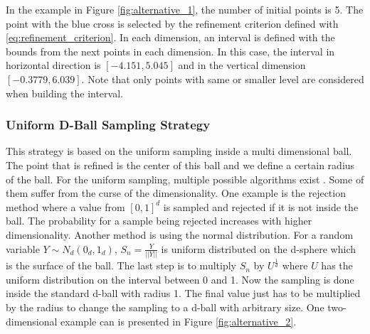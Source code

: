 In the example in Figure \ref{fig:alternative_1}, the number of initial points is 5. The point with the blue cross is selected by the refinement criterion defined with \ref{eq:refinement_criterion}. In each dimension, an interval is defined with the bounds from the next points in each dimension. In this case, the interval in horizontal direction is $ [-4.151, 5.045] $ and in the vertical dimension $ [-0.3779, 6.039] $. Note that only points with same or smaller level are considered when building the interval.

\subsubsection{Uniform D-Ball Sampling Strategy}

This strategy is based on the uniform sampling inside a multi dimensional ball. The point that is refined is the center of this ball and we define a certain radius of the ball. For the uniform sampling, multiple possible algorithms exist \cite{HARMAN20102297}. Some of them suffer from the curse of the dimensionality. One example is the rejection method where a value from $ [0,1]^d $ is sampled and rejected if it is not inside the ball. The probability for a sample being rejected increases with higher dimensionality. Another method is using the normal distribution. For a random variable $ Y \sim N_d(0_d, 1_d) $, $ S_n = \frac{Y}{|| Y ||} $ is uniform distributed on the d-sphere which is the surface of the ball. The last step is to multiply $ S_n $ by $ U^{\frac{1}{d}} $ where $ U $ has the uniform distribution on the interval between 0 and 1. Now the sampling is done inside the standard d-ball with radius 1. The final value just has to be multiplied by the radius to change the sampling to a d-ball with arbitrary size. One two-dimensional example can is presented in Figure \ref{fig:alternative_2}.

